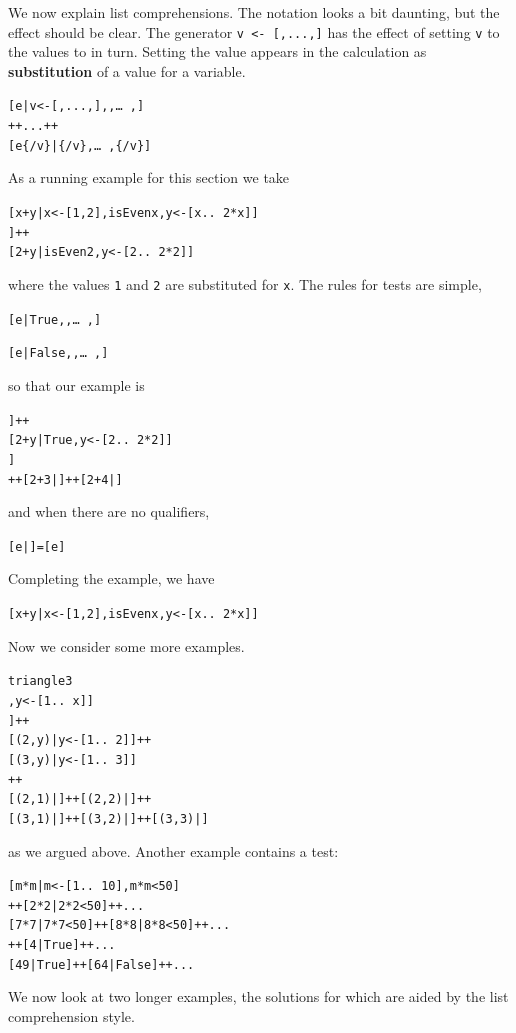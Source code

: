 We now explain list comprehensions. The notation looks a bit daunting,
but the effect should be clear. The generator \texttt{v <-
[,...,]} has the effect of setting \texttt{v} to the
values \texttt{} to \texttt{} in turn. Setting the value
appears in the calculation as \textbf{substitution} of a value for a variable. 
\begin{alltt}
[ e | v <- [,...,] ,  , \ldots\ ,  ]  
    ++ ... ++
    [ e\{/v\} | \{/v\} , \ldots\ , \{/v\} ] 
\end{alltt}
As a running example for this section we take 
\begin{alltt}
[ x+y | x <- [1,2] , isEven x , y <- [x ..\ 2*x] ]
\step [ 1+y | isEven 1 , y <- [1 ..\ 2*1] ] ++
    [ 2+y | isEven 2 , y <- [2 ..\ 2*2] ]
\end{alltt} 
where the values \texttt{1} and \texttt{2} are substituted for \texttt{x}.
The rules for tests are simple,
\begin{alltt}
[ e | True  ,  , \ldots\ ,  ] 

[ e | False ,  , \ldots\ ,  ] 
\step []
\end{alltt}
so that our example is
\begin{alltt}
\step [ 1+y | False , y <- [1 ..\ 2*1] ] ++
    [ 2+y | True , y <- [2 ..\ 2*2] ]
\step [ 2+y | y <- [2,3,4] ]
\step [ 2+2 | ] ++ [ 2+3 | ] ++ [ 2+4 | ]
\end{alltt}
and when there are no qualifiers,
\begin{alltt}
[ e | ] = [ e ]
\end{alltt}
Completing the example, we have
\begin{alltt}
[ x+y | x <- [1,2] , isEven x , y <- [x ..\ 2*x] ] 
\step [4,5,6]
\end{alltt}
Now we consider some more examples.
\begin{alltt}
triangle 3
\step [ (x,y) | x <- [1 ..\ 3] , y <- [1 ..\ x] ]
\step [ (1,y) | y <- [1 ..\ 1] ] ++ 
    [ (2,y) | y <- [1 ..\ 2] ] ++
    [ (3,y) | y <- [1 ..\ 3] ]
\step [ (1,1) | ] ++ 
    [ (2,1) | ] ++ [ (2,2) | ] ++
    [ (3,1) | ] ++ [ (3,2) | ] ++ [ (3,3) | ]
\step [(1,1),(2,1),(2,2),(3,1),(3,2),(3,3)]
\end{alltt}
as we argued above. Another example contains a test:
\begin{alltt}
[ m*m | m <- [1 ..\ 10] , m*m<50 ]
\step [ 1*1 | 1*1<50 ] ++ [ 2*2 | 2*2<50 ] ++ ...
    [ 7*7 | 7*7<50 ] ++ [ 8*8 | 8*8<50 ] ++ ...
\step [ 1  | True ] ++ [ 4  | True ] ++ ...
    [ 49 | True ] ++ [ 64 | False ] ++ ...
\step [1,4,...49]
\end{alltt}
We now look at two longer examples, the  solutions for which are aided by the list
comprehension style.
